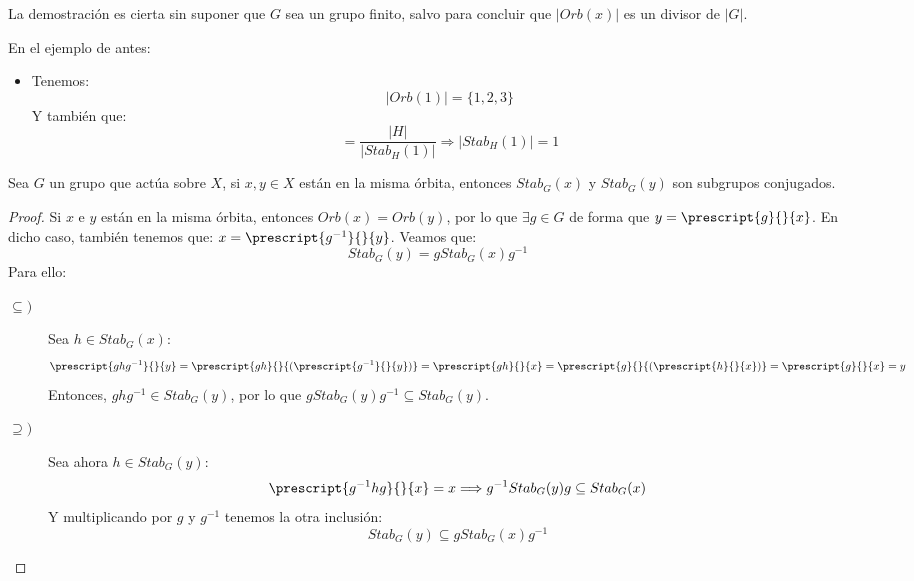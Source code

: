 La demostración es cierta sin suponer que $G$ sea un grupo finito, salvo para concluir que $|Orb(x)|$ es un divisor de $|G|$.

\begin{ejemplo}
    En el ejemplo de antes:
    \begin{itemize}
        \item Tenemos:
            \begin{equation*}
                |Orb(1)| = \{1,2,3\}
            \end{equation*}
            Y también que:
            \begin{equation*}
                [H:Stab_H(1)] = \dfrac{|H|}{|Stab_H(1)|} \Longrightarrow |Stab_H(1)| = 1
            \end{equation*}
    \end{itemize}
\end{ejemplo}

\begin{prop}
    Sea $G$ un grupo que actúa sobre $X$, si $x,y\in X$ están en la misma órbita, entonces $Stab_G(x)$ y $Stab_G(y)$ son subgrupos conjugados.
    \begin{proof}
        Si $x$ e $y$ están en la misma órbita, entonces $Orb(x) = Orb(y)$, por lo que $\exists g\in G$ de forma que $y = \prescript{g}{}{x}$. En dicho caso, también tenemos que: $x = \prescript{g^{-1}}{}{y}$. Veamos que:
        \begin{equation*}
            Stab_G(y) = gStab_G(x)g^{-1}
        \end{equation*}
        Para ello:
        \begin{description}
            \item [$\subseteq)$] Sea $h\in Stab_G(x)$:
                \begin{equation*}
                    \prescript{ghg^{-1}}{}{y} = \prescript{gh}{}{(\prescript{g^{-1}}{}{y})} = \prescript{gh}{}{x} = \prescript{g}{}{(\prescript{h}{}{x})} = \prescript{g}{}{x} = y
                \end{equation*}
                Entonces, $ghg^{-1}\in Stab_G(y)$, por lo que $gStab_G(y)g^{-1} \subseteq Stab_G(y)$.
            \item [$\supseteq)$] Sea ahora $h\in Stab_G(y)$:
                \begin{equation*}
                    \prescript{g^{-1}hg}{}{x} = x \Longrightarrow g^{-1}Stab_G(y)g \subseteq Stab_G(x)
                \end{equation*}
                Y multiplicando por $g$ y $g^{-1}$ tenemos la otra inclusión:
                \begin{equation*}
                    Stab_G(y) \subseteq gStab_G(x)g^{-1}
                \end{equation*} \qedhere
        \end{description}
    \end{proof}
\end{prop}

